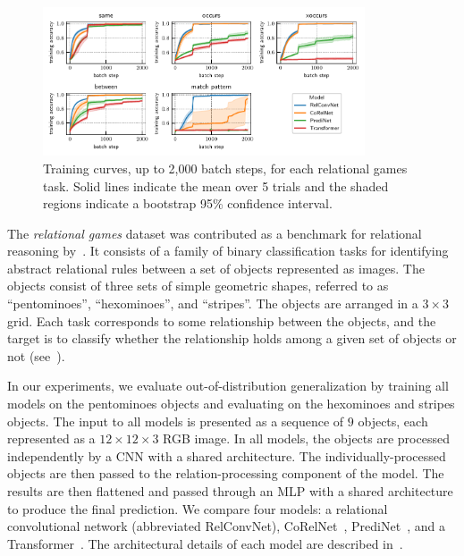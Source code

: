 \begin{figure}
    \centering
    \includegraphics[width=0.85\textwidth]{figs/experiments/all_training_curves.pdf}
    \vskip-12pt
    \caption{Training curves, up to 2,000 batch steps, for each relational games task. Solid lines indicate the mean over 5 trials and the shaded regions indicate a bootstrap 95\% confidence interval.}\label{fig:training_curves}
    \vskip-12pt
\end{figure}

The \textit{relational games} dataset was contributed as a benchmark for relational reasoning by~\citep{shanahanExplicitlyRelationalNeural}. It consists of a family of binary classification tasks for identifying abstract relational rules between a set of objects represented as images. The objects consist of three sets of simple geometric shapes, referred to as ``pentominoes'', ``hexominoes'', and ``stripes''. The objects are arranged in a $3 \times 3$ grid. Each task corresponds to some relationship between the objects, and the target is to classify whether the relationship holds among a given set of objects or not (see~).

In our experiments, we evaluate out-of-distribution generalization by training all models on the pentominoes objects and evaluating on the hexominoes and stripes objects. The input to all models is presented as a sequence of $9$ objects, each represented as a $12 \times 12 \times 3$ RGB image. In all models, the objects are processed independently by a CNN with a shared architecture. The individually-processed objects are then passed to the relation-processing component of the model. The results are then flattened and passed through an MLP with a shared architecture to produce the final prediction. We compare four models: a relational convolutional network (abbreviated RelConvNet), CoRelNet~\citep{kergNeuralArchitecture2022}, PrediNet~\citep{shanahanExplicitlyRelationalNeural}, and a Transformer~\citep{vaswani2017attention}. The architectural details of each model are described in~.

